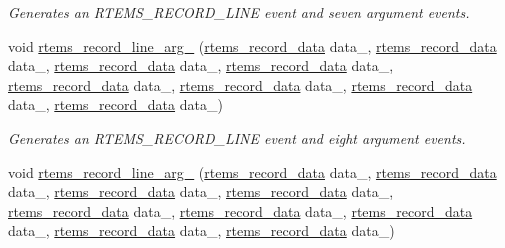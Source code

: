 \begin{DoxyCompactItemize}
\begin{DoxyCompactList}\small\item\em Generates an R\+T\+E\+M\+S\+\_\+\+R\+E\+C\+O\+R\+D\+\_\+\+L\+I\+NE event and seven argument events. \end{DoxyCompactList}\item 
void \mbox{\hyperlink{group__RTEMSRecord_ga899210b034f9ee8addb7d142ffd6d549}{rtems\+\_\+record\+\_\+line\+\_\+arg\+\_}} (\mbox{\hyperlink{group__RTEMSRecord_gab483bd3ec735835dac6788b78c817eab}{rtems\+\_\+record\+\_\+data}} data\+\_, \mbox{\hyperlink{group__RTEMSRecord_gab483bd3ec735835dac6788b78c817eab}{rtems\+\_\+record\+\_\+data}} data\+\_, \mbox{\hyperlink{group__RTEMSRecord_gab483bd3ec735835dac6788b78c817eab}{rtems\+\_\+record\+\_\+data}} data\+\_, \mbox{\hyperlink{group__RTEMSRecord_gab483bd3ec735835dac6788b78c817eab}{rtems\+\_\+record\+\_\+data}} data\+\_, \mbox{\hyperlink{group__RTEMSRecord_gab483bd3ec735835dac6788b78c817eab}{rtems\+\_\+record\+\_\+data}} data\+\_, \mbox{\hyperlink{group__RTEMSRecord_gab483bd3ec735835dac6788b78c817eab}{rtems\+\_\+record\+\_\+data}} data\+\_, \mbox{\hyperlink{group__RTEMSRecord_gab483bd3ec735835dac6788b78c817eab}{rtems\+\_\+record\+\_\+data}} data\+\_, \mbox{\hyperlink{group__RTEMSRecord_gab483bd3ec735835dac6788b78c817eab}{rtems\+\_\+record\+\_\+data}} data\+\_)
\begin{DoxyCompactList}\small\item\em Generates an R\+T\+E\+M\+S\+\_\+\+R\+E\+C\+O\+R\+D\+\_\+\+L\+I\+NE event and eight argument events. \end{DoxyCompactList}\item 
void \mbox{\hyperlink{group__RTEMSRecord_ga64f6642bf2ec6f60d7e5e2b1bc3fd64f}{rtems\+\_\+record\+\_\+line\+\_\+arg\+\_}} (\mbox{\hyperlink{group__RTEMSRecord_gab483bd3ec735835dac6788b78c817eab}{rtems\+\_\+record\+\_\+data}} data\+\_, \mbox{\hyperlink{group__RTEMSRecord_gab483bd3ec735835dac6788b78c817eab}{rtems\+\_\+record\+\_\+data}} data\+\_, \mbox{\hyperlink{group__RTEMSRecord_gab483bd3ec735835dac6788b78c817eab}{rtems\+\_\+record\+\_\+data}} data\+\_, \mbox{\hyperlink{group__RTEMSRecord_gab483bd3ec735835dac6788b78c817eab}{rtems\+\_\+record\+\_\+data}} data\+\_, \mbox{\hyperlink{group__RTEMSRecord_gab483bd3ec735835dac6788b78c817eab}{rtems\+\_\+record\+\_\+data}} data\+\_, \mbox{\hyperlink{group__RTEMSRecord_gab483bd3ec735835dac6788b78c817eab}{rtems\+\_\+record\+\_\+data}} data\+\_, \mbox{\hyperlink{group__RTEMSRecord_gab483bd3ec735835dac6788b78c817eab}{rtems\+\_\+record\+\_\+data}} data\+\_, \mbox{\hyperlink{group__RTEMSRecord_gab483bd3ec735835dac6788b78c817eab}{rtems\+\_\+record\+\_\+data}} data\+\_, \mbox{\hyperlink{group__RTEMSRecord_gab483bd3ec735835dac6788b78c817eab}{rtems\+\_\+record\+\_\+data}} data\+\_)

\end{DoxyCompactItemize}

